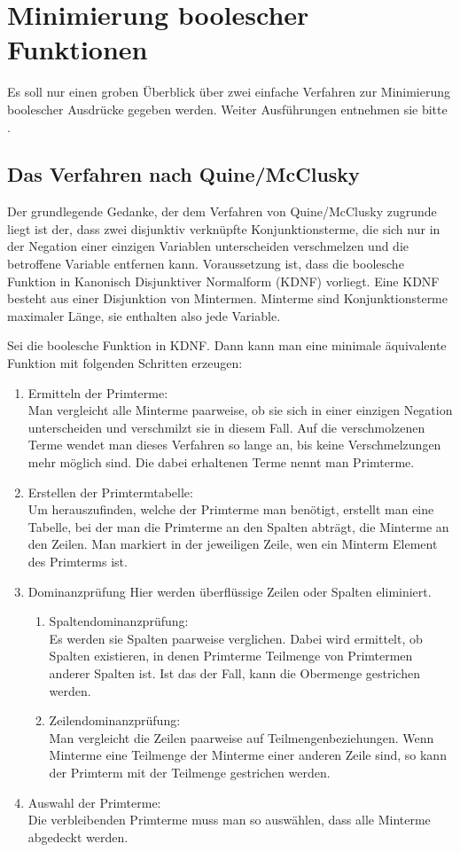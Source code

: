 \documentclass[a4paper, 11pt]{book}
\begin{document}
{	\chapter{Minimierung boolescher Funktionen} \label{Minimierung}
	Es soll nur einen groben Überblick über zwei einfache Verfahren zur Minimierung boolescher Ausdrücke gegeben werden. Weiter Ausführungen entnehmen sie bitte \cite{G01}.
	\section{Das Verfahren nach Quine/McClusky} \label{Min_QMC} 
	Der grundlegende Gedanke, der dem Verfahren von Quine/McClusky zugrunde liegt ist der, dass zwei disjunktiv verknüpfte  Konjunktionsterme, die sich nur in der Negation einer einzigen Variablen unterscheiden verschmelzen und die betroffene Variable entfernen kann. Voraussetzung ist, dass die boolesche Funktion in Kanonisch Disjunktiver Normalform (KDNF) vorliegt. Eine KDNF besteht aus einer Disjunktion von Mintermen. Minterme sind Konjunktionsterme maximaler Länge, sie enthalten also jede Variable.
	
	Sei die boolesche Funktion in KDNF. Dann kann man eine minimale äquivalente Funktion mit folgenden Schritten erzeugen:
	\begin{enumerate}
		\item Ermitteln der Primterme:\\
		Man vergleicht alle Minterme paarweise, ob sie sich in einer einzigen Negation unterscheiden und verschmilzt sie in diesem Fall. Auf die verschmolzenen Terme wendet man dieses Verfahren so lange an, bis keine Verschmelzungen mehr möglich sind. Die dabei erhaltenen Terme nennt man Primterme.
		\item Erstellen der Primtermtabelle:\\
		Um herauszufinden, welche der Primterme man benötigt, erstellt man eine Tabelle, bei der man die Primterme an den Spalten abträgt, die Minterme an den Zeilen. Man markiert in der jeweiligen Zeile, wen ein Minterm Element des Primterms ist.
		\item Dominanzprüfung
		Hier werden überflüssige Zeilen oder Spalten eliminiert. 
		\begin{enumerate}
			\item Spaltendominanzprüfung:\\
			Es werden sie Spalten paarweise verglichen. Dabei wird ermittelt, ob Spalten existieren, in denen Primterme Teilmenge von Primtermen anderer Spalten ist. Ist das der Fall, kann die Obermenge gestrichen werden. 
			\item Zeilendominanzprüfung:\\
			Man vergleicht die Zeilen paarweise auf Teilmengenbeziehungen. Wenn Minterme eine Teilmenge der Minterme einer anderen Zeile sind, so kann der Primterm mit der Teilmenge gestrichen werden. 
		\end{enumerate}
		\item Auswahl der Primterme:\\
		Die verbleibenden Primterme muss man so auswählen, dass alle Minterme abgedeckt werden. 
	\end{enumerate}
}
\end{document}
